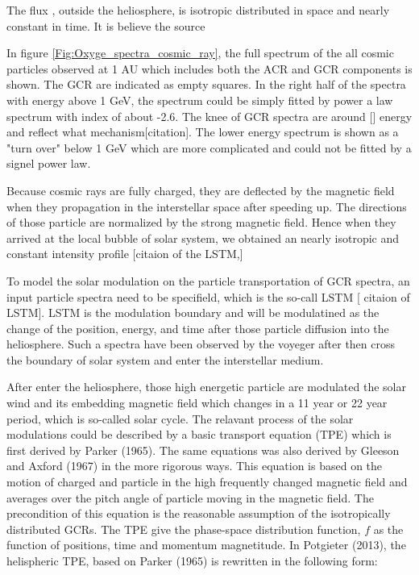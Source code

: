 The flux , outside the heliosphere,  is isotropic distributed in space and nearly constant in time.  It is believe the source 

In figure \ref{Fig:Oxyge_spectra_cosmic_ray}, the full spectrum of the all cosmic particles observed at 1 AU which includes both the \ac{ACR} and \ac{GCR} components is shown. The \acs{GCR} are indicated as empty squares. In the right half of the spectra with energy above 1 GeV, the spectrum could be simply fitted by power a law spectrum with index of about -2.6. The knee of GCR spectra are around [] energy and reflect what mechanism[citation]. The lower energy spectrum is shown as a "turn over" below 1 GeV which are more complicated and could not be fitted by a signel power law. 

Because cosmic rays are fully charged, they are deflected by the magnetic field when they propagation in the interstellar space after speeding up. The directions of those particle are normalized by the strong magnetic field. Hence when they arrived at the local bubble of solar system, we obtained an nearly isotropic and constant intensity profile [citaion of the LSTM,]

To model the solar modulation on the particle transportation of GCR spectra, an input particle spectra need to be specifield, which is the so-call LSTM [ citaion of LSTM]. LSTM is the modulation boundary and will be modulatined as the change of the position, energy, and time after those particle diffusion into the heliosphere. Such a spectra have been observed by the voyeger after then cross the boundary of solar system and enter the interstellar medium.



After enter the heliosphere, those high energetic particle are modulated the solar wind and its embedding magnetic field  which changes in a 11 year or 22 year period, which is so-called solar cycle.
The relavant process of the solar modulations could be described by a basic transport equation (TPE) which is first derived by Parker (1965). The same equations was also derived by Gleeson and Axford (1967) in the more rigorous ways. This equation is based on the motion of charged and particle in the high frequently changed magnetic field and averages over the pitch angle of particle moving in the magnetic field. The precondition of this equation is the reasonable assumption of the isotropically distributed GCRs. The TPE give the phase-space distribution function, $f$ as the function of positions, time and momentum magnetitude. In Potgieter (2013), the helispheric TPE, based on Parker (1965) is rewritten in the following form:

